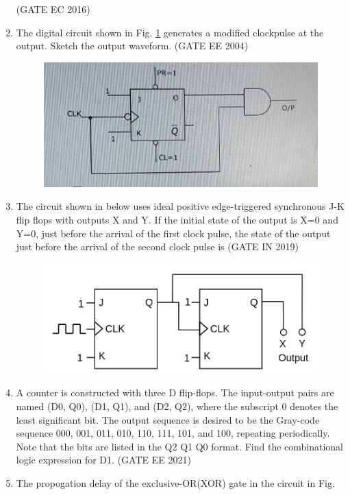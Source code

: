 \begin{enumerate}[label=\arabic*.,ref=\theenumi]
\hfill{(GATE EC 2016)}
%
	\item The digital circuit shown in Fig. \ref{fig:2004-gate-ee-68} generates a modified clockpulse at the output. Sketch the output waveform.
\label{prob:2004-gate-ee-68}
\hfill (GATE EE 2004)
%
\begin{figure}[H]
	\centering
	\includegraphics[width=0.75\columnwidth]{figs/2004-gate-ee-68.jpg}
	\caption{}
\label{fig:2004-gate-ee-68}
\end{figure}
\item The circuit shown in 
below uses ideal positive edge-triggered synchronous J-K flip flops with outputs X and Y. If the initial state of the output is X=0 and Y=0, just before the arrival of the first clock pulse, the state of the output just before the arrival of the second clock pulse is
\label{prob:2019-gate-in-12}
\hfill (GATE IN 2019)
\begin{figure}[H]
	\centering
	    \includegraphics[width=0.75\columnwidth]{figs/2019-gate-in-12.png}
\caption{}
\label{fig:2019-gate-in-12}
\end{figure}
	\item 		
		A counter is constructed with three D flip-flops. The input-output pairs are named (D0, Q0), (D1, Q1), and (D2, Q2), where the subscript 0 denotes the least significant bit. The output sequence is desired to be the Gray-code sequence 000, 001, 011, 010, 110, 111, 101, and 100, repeating periodically. Note that the bits are listed in the Q2 Q1 Q0 format. Find the combinational logic expression for D1.
\label{prob:2021-gate-ee-37}
\hfill (GATE EE 2021)
\iffalse
\item The propogation delay of the exclusive-OR(XOR) gate in the circuit in Fig.

\end{enumerate}

